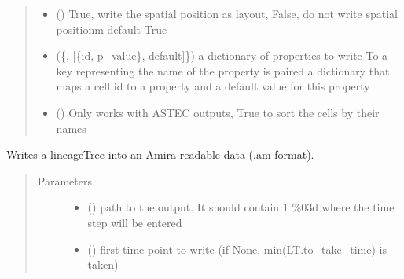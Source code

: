 \documentclass[letterpaper,10pt,english]{sphinxmanual}
\begin{document}
\begin{fulllineitems}
\begin{fulllineitems}
\begin{quote}
\begin{description}
\begin{itemize}
\item {} 
 () \textendash{} True, write the spatial position as layout,
False, do not write spatial positionm
default True

\item {} 
 (\{, {[}\{id, p\_value\}, default{]}\}) \textendash{} a dictionary of properties to write
To a key representing the name of the property is
paired a dictionary that maps a cell id to a property
and a default value for this property

\item {} 
 () \textendash{} Only works with ASTEC outputs, True to sort the cells by their names

\end{itemize}

\end{description}\end{quote}

\end{fulllineitems}


\begin{fulllineitems}
\label{\detokenize{index:LineageTree.lineageTree.write_to_am}}
Writes a lineageTree into an Amira readable data (.am format).
\begin{quote}\begin{description}
\item[{Parameters}] \leavevmode\begin{itemize}
\item {} 
 () \textendash{} path to the output. It should contain 1 \%03d where the time step will be entered

\item {} 
 () \textendash{} first time point to write (if None, min(LT.to\_take\_time) is taken)


\end{itemize}
\end{description}
\end{quote}
\end{fulllineitems}
\end{fulllineitems}
\end{document}
